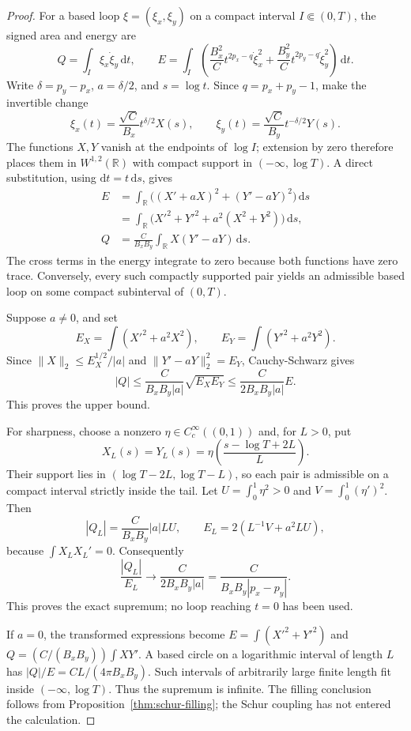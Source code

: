 \documentclass[10pt,a4paper]{article}
\numberwithin{equation}{section}
\theoremstyle{definition}
\theoremstyle{remark}
\newcommand{\dd}{\mathrm d}
\begin{document}
\begin{proof}
For a based loop $\xi=(\xi_x,\xi_y)$ on a compact interval
$I\Subset(0,T)$, the signed area and energy are
\[
 Q=\int_I\xi_x\dot\xi_y\,\dd t,
 \qquad
 E=\int_I\left(\frac{B_x^2}{C}t^{2p_x-q}\dot\xi_x^2
              +\frac{B_y^2}{C}t^{2p_y-q}\dot\xi_y^2\right)\,\dd t.
\]
Write $\delta=p_y-p_x$, $a=\delta/2$, and $s=\log t$.  Since
$q=p_x+p_y-1$, make the invertible change
\[
 \xi_x(t)=\frac{\sqrt C}{B_x}t^{\delta/2}X(s),
 \qquad
 \xi_y(t)=\frac{\sqrt C}{B_y}t^{-\delta/2}Y(s).
\]
The functions $X,Y$ vanish at the endpoints of $\log I$; extension
by zero therefore places them in $W^{1,2}(\mathbb R)$ with compact
support in $(-\infty,\log T)$.  A direct substitution, using
$\dd t=t\,\dd s$, gives
\begin{align*}
 E&=\int_{\mathbb R}
       \bigl((X'+aX)^2+(Y'-aY)^2\bigr)\,\dd s\\
  &=\int_{\mathbb R}
       \bigl(X'^2+Y'^2+a^2(X^2+Y^2)\bigr)\,\dd s,\\
 Q&=\frac{C}{B_xB_y}\int_{\mathbb R}X(Y'-aY)\,\dd s.
\end{align*}
The cross terms in the energy integrate to zero because both
functions have zero trace.  Conversely, every such compactly supported
pair yields an admissible based loop on some compact subinterval of
$(0,T)$.

Suppose $a\ne0$, and set
\[
 E_X=\int(X'^2+a^2X^2),\qquad
 E_Y=\int(Y'^2+a^2Y^2).
\]
Since $\|X\|_2\le E_X^{1/2}/|a|$ and
$\|Y'-aY\|_2^2=E_Y$, Cauchy-Schwarz gives
\[
 |Q|\le\frac{C}{B_xB_y|a|}\sqrt{E_XE_Y}
       \le\frac{C}{2B_xB_y|a|}E.
\]
This proves the upper bound.

For sharpness, choose a nonzero $\eta\in C_c^\infty((0,1))$ and,
for $L>0$, put
\[
 X_L(s)=Y_L(s)=
 \eta\left(\frac{s-\log T+2L}{L}\right).
\]
Their support lies in $(\log T-2L,\log T-L)$, so each pair is
admissible on a compact interval strictly inside the tail.  Let
$U=\int_0^1\eta^2>0$ and $V=\int_0^1(\eta')^2$.  Then
\[
 |Q_L|=\frac{C}{B_xB_y}|a|LU,\qquad
 E_L=2(L^{-1}V+a^2LU),
\]
because $\int X_LX_L'=0$.  Consequently
\[
 \frac{|Q_L|}{E_L}\longrightarrow
 \frac{C}{2B_xB_y|a|}
 =\frac{C}{B_xB_y|p_x-p_y|}.
\]
This proves the exact supremum; no loop reaching $t=0$ has been used.

If $a=0$, the transformed expressions become
$E=\int(X'^2+Y'^2)$ and
$Q=(C/(B_xB_y))\int XY'$.  A based circle on a logarithmic interval
of length $L$ has $|Q|/E=CL/(4\pi B_xB_y)$.  Such intervals of
arbitrarily large finite length fit inside $(-\infty,\log T)$.
Thus the supremum is infinite.  The filling conclusion follows from
Proposition~\ref{thm:schur-filling}; the Schur coupling has not entered
the calculation.
\end{proof}
\end{document}
